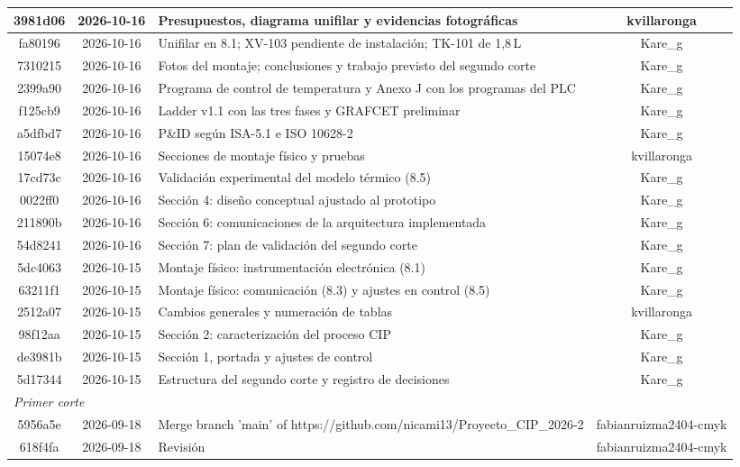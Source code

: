 \begin{longtable}{|c|c|p{7cm}|c|}
3981d06 & 2026-10-16 & Presupuestos, diagrama unifilar y evidencias fotográficas & kvillaronga \\ \hline
fa80196 & 2026-10-16 & Unifilar en 8.1; XV-103 pendiente de instalación; TK-101 de 1,8\,L & Kare\_g \\ \hline
7310215 & 2026-10-16 & Fotos del montaje; conclusiones y trabajo previsto del segundo corte & Kare\_g \\ \hline
2399a90 & 2026-10-16 & Programa de control de temperatura y Anexo J con los programas del PLC & Kare\_g \\ \hline
f125cb9 & 2026-10-16 & Ladder v1.1 con las tres fases y GRAFCET preliminar & Kare\_g \\ \hline
a5dfbd7 & 2026-10-16 & P\&ID según ISA-5.1 e ISO 10628-2 & Kare\_g \\ \hline
15074e8 & 2026-10-16 & Secciones de montaje físico y pruebas & kvillaronga \\ \hline
17cd73c & 2026-10-16 & Validación experimental del modelo térmico (8.5) & Kare\_g \\ \hline
0022ff0 & 2026-10-16 & Sección 4: diseño conceptual ajustado al prototipo & Kare\_g \\ \hline
211890b & 2026-10-16 & Sección 6: comunicaciones de la arquitectura implementada & Kare\_g \\ \hline
54d8241 & 2026-10-16 & Sección 7: plan de validación del segundo corte & Kare\_g \\ \hline
5dc4063 & 2026-10-15 & Montaje físico: instrumentación electrónica (8.1) & Kare\_g \\ \hline
63211f1 & 2026-10-15 & Montaje físico: comunicación (8.3) y ajustes en control (8.5) & Kare\_g \\ \hline
2512a07 & 2026-10-15 & Cambios generales y numeración de tablas & kvillaronga \\ \hline
98f12aa & 2026-10-15 & Sección 2: caracterización del proceso CIP & Kare\_g \\ \hline
de3981b & 2026-10-15 & Sección 1, portada y ajustes de control & Kare\_g \\ \hline
5d17344 & 2026-10-15 & Estructura del segundo corte y registro de decisiones & Kare\_g \\ \hline
\multicolumn{4}{|l|}{\textit{Primer corte}} \\ \hline
5956a5e & 2026-09-18 & Merge branch 'main' of https://github.com/nicami13/Proyecto\_CIP\_2026-2 & fabianruizma2404-cmyk \\ \hline
618f4fa & 2026-09-18 & Revisión & fabianruizma2404-cmyk \\ \hline

\end{longtable}
